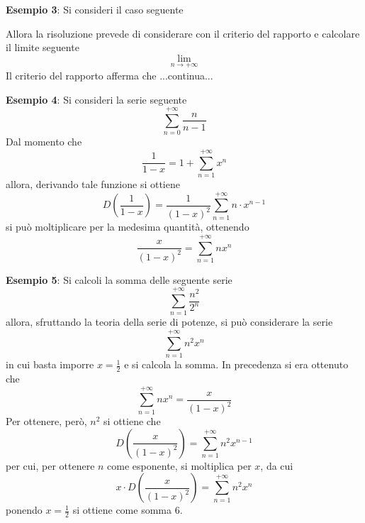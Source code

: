 \documentclass[a4paper]{extarticle}
\begin{document}
\vspace{1em}
\noindent
\textbf{Esempio 3}: Si consideri il caso seguente

Allora la risoluzione prevede di considerare con il criterio del rapporto e calcolare il limite seguente
\[\lim_{n \to +\infty} \]
Il criterio del rapporto afferma che 
...continua...

\vspace{1em}
\noindent
\textbf{Esempio 4}: Si consideri la serie seguente
\[\sum_{n=0}^{+\infty} \frac{n}{n-1}\]
Dal momento che
\[\frac{1}{1-x} = 1 + \sum_{n=1}^{+\infty} x^n\]
allora, derivando tale funzione si ottiene
\[D \left(\frac{1}{1-x}\right) = \frac{1}{(1-x)^2} \sum_{n=1}^{+\infty} n \cdot x^{n-1}\]
si può moltiplicare per la medesima quantità, ottenendo
\[\frac{x}{(1-x)^2} = \sum_{n=1}^{+\infty} n x^n\]

\vspace{1em}
\noindent
\textbf{Esempio 5}: Si calcoli la somma delle seguente serie
\[\sum_{n=1}^{+\infty} \frac{n^2}{2^n}\]
allora, sfruttando la teoria della serie di potenze, si può considerare la serie
\[\sum_{n=1}^{+\infty} n^2 x^n\]
in cui basta imporre $x=\frac{1}{2}$ e si calcola la somma. In precedenza si era ottenuto che
\[\sum_{n=1}^{+\infty} n x^n = \frac{x}{(1-x)^2}\]
Per ottenere, però, $n^2$ si ottiene che
\[D \left(\frac{x}{(1-x)^2}\right) = \sum_{n=1}^{+\infty} n^2 x^{n-1}\]
per cui, per ottenere $n$ come esponente, si moltiplica per $x$, da cui
\[x \cdot D \left(\frac{x}{(1-x)^2}\right) = \sum_{n=1}^{+\infty} n^2 x^n\]
ponendo $x=\frac{1}{2}$ si ottiene come somma $6$.

\vspace{1em}
\end{document}
